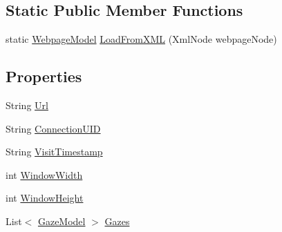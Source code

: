 \subsection*{Static Public Member Functions}
\begin{DoxyCompactItemize}
\item 
static \hyperlink{class_web_analyzer_1_1_models_1_1_data_model_1_1_webpage_model}{Webpage\+Model} \hyperlink{class_web_analyzer_1_1_models_1_1_data_model_1_1_webpage_model_a26999baeddbe48b5c6f10a0b7510c807}{Load\+From\+X\+M\+L} (Xml\+Node webpage\+Node)
\end{DoxyCompactItemize}
\subsection*{Properties}
\begin{DoxyCompactItemize}
\item 
String \hyperlink{class_web_analyzer_1_1_models_1_1_data_model_1_1_webpage_model_a956b067ed12f422f646b7e2a4b6bb42d}{Url}
\item 
String \hyperlink{class_web_analyzer_1_1_models_1_1_data_model_1_1_webpage_model_a5f1bed3947c7e7b6a5fe34fdd23f3841}{Connection\+U\+I\+D}
\item 
String \hyperlink{class_web_analyzer_1_1_models_1_1_data_model_1_1_webpage_model_ac3378fdc78273706547ec3a9d377ef9a}{Visit\+Timestamp}
\item 
int \hyperlink{class_web_analyzer_1_1_models_1_1_data_model_1_1_webpage_model_a3e3926562c05a94a3111f3a07cd8e131}{Window\+Width}
\item 
int \hyperlink{class_web_analyzer_1_1_models_1_1_data_model_1_1_webpage_model_a76b6e0896f14f8d7c0d7bf94b94ec058}{Window\+Height}
\item 
List$<$ \hyperlink{class_web_analyzer_1_1_models_1_1_data_model_1_1_gaze_model}{Gaze\+Model} $>$ \hyperlink{class_web_analyzer_1_1_models_1_1_data_model_1_1_webpage_model_acb4a6ecac0e4ef9ed2df7b33e4694b31}{Gazes}
\item 

\end{DoxyCompactItemize}
